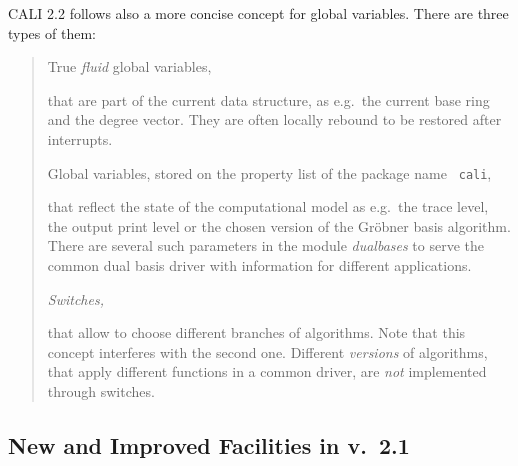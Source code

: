 \documentclass[a4paper,11pt]{article}
\newcommand{\gr}{Gr\"obner}
\newcommand{\ind}[1]{{\em #1}\index{#1}}
\newcommand{\pbx}[1]{\mbox{}\hfill \parbox[t]{12cm}{#1} \pagebreak[3]}
\begin{document}
CALI 2.2 follows also a more concise concept for global
variables. There are three types of them: 
\begin{quote} 
True {\em fluid} global variables,

\pbx{that are part of the current data structure, as e.g.\ the current 
base ring and the degree vector. They are often locally rebound to be
restored after interrupts.} 

Global variables, stored on the property list of the package name {\tt
cali}, 

\pbx{that reflect the state of the computational model as e.g.\ the
trace level, the output print level or the chosen version of the {\gr}
basis algorithm. There are several such parameters in the module
\ind{dualbases} to serve the common dual basis driver with
information for different applications.} 

{\em Switches,}

\pbx{that allow to choose different branches of algorithms. Note that
this concept interferes with the second one. Different {\em versions}
of algorithms, that apply different functions in a common driver, are
{\em not} implemented through switches.} 
\end{quote} 

\subsection{New and Improved Facilities in v.\ 2.1}
\end{document}
